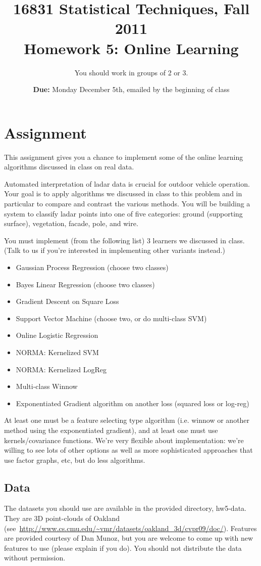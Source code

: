 \documentclass[letterpaper]{article}
\title{16831 Statistical Techniques, Fall 2011\\Homework 5: Online Learning}
\date{\textbf{Due:} Monday December 5th, emailed by the beginning of class}
\author{You should work in groups of 2 or 3.}
\begin{document}
\maketitle

\section*{Assignment}

This assignment gives you a chance to implement some of the online learning algorithms discussed in class on real data.

Automated interpretation of ladar data is crucial for outdoor vehicle operation. Your goal is to apply algorithms we discussed in class to this problem and in particular to compare and contrast the various methods. You will be building a system to classify ladar points into one of five categories: ground (supporting surface), vegetation, facade, pole, and wire.

You must implement (from the following list) 3 learners we discussed in class. (Talk to us if you're interested in implementing other variants instead.)

\begin{itemize}

\item Gaussian Process Regression (choose two classes)
\item Bayes Linear Regression (choose two classes)
\item Gradient Descent on Square Loss
\item Support Vector Machine (choose two, or do multi-class SVM)
\item Online Logistic Regression
\item NORMA: Kernelized SVM
\item NORMA: Kernelized LogReg
\item Multi-class Winnow
\item Exponentiated Gradient algorithm on another loss (squared loss or log-reg)

\end{itemize}

At least one must be a feature selecting type algorithm (i.e. winnow or another method using the exponentiated gradient), and at least one must use kernels/covariance functions. We're very flexible about implementation: we're willing to see lots of other options as well as more sophisticated approaches that use factor graphs, etc, but do less algorithms.

\subsection*{Data}
The datasets you should use are available in the provided directory, hw5-data. They are 3D point-clouds of Oakland (see~\url{http://www.cs.cmu.edu/~vmr/datasets/oakland_3d/cvpr09/doc/}).  Features are provided courtesy of Dan Munoz, but you are welcome to come up with new features to use (please explain if you do).  You should not distribute the data without permission.
\end{document}
